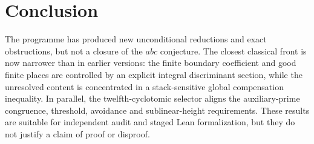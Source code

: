 \documentclass[11pt]{amsart}
\theoremstyle{definition}
\theoremstyle{remark}
\begin{document}
\section{Conclusion}

The programme has produced new unconditional reductions and exact obstructions, but not a closure of the $abc$ conjecture.  The closest classical front is now narrower than in earlier versions: the finite boundary coefficient and good finite places are controlled by an explicit integral discriminant section, while the unresolved content is concentrated in a stack-sensitive global compensation inequality.  In parallel, the twelfth-cyclotomic selector aligns the auxiliary-prime congruence, threshold, avoidance and sublinear-height requirements.  These results are suitable for independent audit and staged Lean formalization, but they do not justify a claim of proof or disproof.
\end{document}
